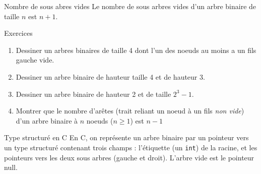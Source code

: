 \documentclass[10pt]{beamer}
\begin{document}
\begin{frame}[fragile]{\Ctitle}{\stitle}
	\begin{alertblock}{Nombre de sous abres vides}
		Le nombre de sous arbres vides d'un arbre binaire de taille $n$ est $n+1$.
	\end{alertblock}
\end{frame}

\begin{frame}[fragile]{\Ctitle}{\stitle}
	\begin{exampleblock}{Exercices}
		\begin{enumerate}
			\item<1-> Dessiner un arbres binaires de taille 4 dont l'un des noeuds au moins a un fils gauche vide.
			\item<2-> Dessiner un arbre binaire de hauteur taille 4 et de hauteur 3.
			\item<3-> Dessiner un arbre binaire de hauteur 2 et de taille $2^3-1$.
			\item<4-> Montrer que le nombre d'arêtes (trait reliant  un noeud à un fils \textit{non vide}) d'un arbre binaire à $n$ noeuds ($n \geqslant 1$) est $n-1$
		\end{enumerate}
	\end{exampleblock}
\end{frame}

\begin{frame}[fragile]{\Ctitle}{\stitle}
	\begin{block}{Type structuré en C}
		En C, on représente un arbre binaire par un pointeur vers un type structuré contenant trois champs : l'étiquette (un {\tt int}) de la racine, et les pointeurs vers les deux sous arbres (gauche et droit). L'arbre vide est le pointeur {\sc null}.
		\onslide<2->{\inputpartC{\SPATH/arbres_binaires.c}{}{}{4}{11}}
	\end{block}
\end{frame}
\end{document}
